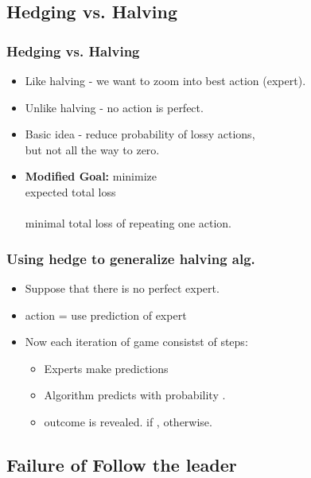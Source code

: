 \documentclass[handout]{beamer}
\begin{document}
\subsection{Hedging vs. Halving}

\begin{frame}
\frametitle{Hedging vs. Halving}
\begin{itemize}
\item Like halving - we want to zoom into best action (expert).
\item Unlike halving - no action is perfect.
\item Basic idea - reduce probability of lossy actions, \\
but {\color{blue}not all the way to zero}.
\item {\bf Modified Goal:}
minimize {\color{blue}{difference between}} \\
expected total loss \\
{\color{blue}{and}} \\
minimal total loss of repeating one action.
\R{\[
\sum_{t=1}^T \distvec{t} \cdot \costvec{t} - \min_i \left(\sum_{t=1}^T \cost{t}{i} \right)
\]}
\end{itemize}
\end{frame}

\begin{frame}
\frametitle{Using hedge to generalize halving alg.}
\begin{itemize}
\item Suppose that there is no perfect expert.
\item action  = use prediction of expert 
\item Now each iteration of game consistst of  steps:
\begin{itemize}
\item Experts make predictions 
\item Algorithm predicts  with probability .
\item outcome  is revealed.  if ,  otherwise.
\end{itemize}
\end{itemize}
\end{frame}

\subsection{Failure of Follow the leader}
\end{document}
